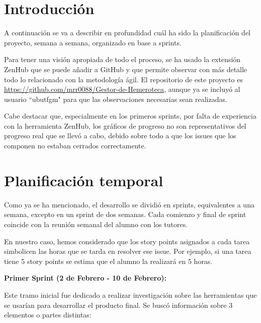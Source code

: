 

\section{Introducción}

A continuación se va a describir en profundidad cuál ha sido la planificación del proyecto, semana a semana, organizado en base a sprints.

Para tener una visión apropiada de todo el proceso, se ha usado la extensión ZenHub que se puede añadir a GitHub y que permite observar con más detalle todo lo relacionado con la metodología ágil. El repositorio de este proyecto es \url{https://github.com/mrr0088/Gestor-de-Hemeroteca}, aunque ya se incluyó al usuario ``ubutfgm" para que las observaciones necesarias sean realizadas.

Cabe destacar que, especialmente en los primeros sprints, por falta de experiencia con la herramienta ZenHub, los gráficos de progreso no son representativos del progreso real que se llevó a cabo, debido sobre todo a que los issues que los componen no estaban cerrados correctamente.


\section{Planificación temporal}

Como ya se ha mencionado, el desarrollo se dividió en sprints, equivalentes a una semana, excepto en un sprint de dos semanas. Cada comienzo y final de sprint coincide con la reunión semanal del alumno con los tutores.

En nuestro caso, hemos considerado que los story points asignados a cada tarea simbolicen las horas que se tarda en resolver ese issue. Por ejemplo, si una tarea tiene 5 story points se estima que el alumno la realizará en 5 horas.

\textbf{Primer Sprint (2 de Febrero - 10 de Febrero):} 

Este tramo inicial fue dedicado a realizar investigación sobre las herramientas que se usarían para desarrollar el producto final. Se buscó información sobre 3 elementos o partes distintas:

